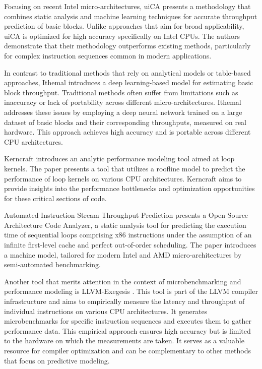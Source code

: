 Focusing on recent Intel micro-architectures, uiCA presents a methodology that combines static analysis
and machine learning techniques for accurate throughput prediction of basic 
blocks\cite{abelUiCAAccurateThroughput2022}. Unlike approaches that aim for broad applicability, 
uiCA is optimized for high accuracy specifically on Intel CPUs. The authors demonstrate that their 
methodology outperforms existing methods, particularly for complex instruction sequences common in 
modern applications.

In contrast to traditional methods that rely on analytical models or table-based approaches, Ithemal 
introduces a deep learning-based model for estimating basic block throughput. Traditional methods 
often suffer from limitations such as inaccuracy or lack of portability across different micro-architectures.
Ithemal addresses these issues by employing a deep neural network trained on a large dataset of basic
blocks and their corresponding throughputs, measured on real hardware. This approach achieves high 
accuracy and is portable across different CPU architectures.

Kerncraft introduces an analytic performance modeling tool aimed at loop 
kernels\cite{hammerKerncraftToolAnalytic2017}. The paper presents a tool that utilizes a roofline model 
to predict the performance of loop kernels on various CPU architectures. Kerncraft aims to provide insights
into the performance bottlenecks and optimization opportunities for these critical sections of code.

Automated Instruction Stream Throughput Prediction presents a Open Source Architecture Code Analyzer, 
a static analysis tool for predicting the execution time of sequential loops comprising x86 instructions
under the assumption of an infinite first-level cache and perfect out-of-order 
scheduling\cite{laukemannAutomatedInstructionStream2018}. The paper introduces a machine model, tailored 
for modern Intel and AMD micro-architectures by semi-automated benchmarking.

Another tool that merits attention in the context of microbenchmarking and performance modeling is 
LLVM-Exegesis . This tool is part of the LLVM compiler infrastructure and aims to 
empirically measure the latency and throughput of individual instructions on various CPU architectures. 
It generates microbenchmarks for specific instruction sequences and executes them to gather performance 
data. This empirical approach ensures high accuracy but is limited to the hardware on which the measurements
are taken. It serves as a valuable resource for compiler optimization and can be complementary to other 
methods that focus on predictive modeling.

